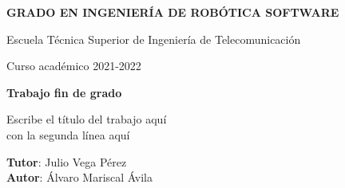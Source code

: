 \thispagestyle{empty}
\vspace{2cm}

\begin{figure}[htb]
	\centerline{}
\end{figure}

\begin{center}
	{\Large {\bf GRADO EN INGENIERÍA DE ROBÓTICA SOFTWARE}}
	\vspace{5mm}

	{\large {Escuela Técnica Superior de Ingeniería de Telecomunicación}}
	\vspace{5mm}

	{\large {Curso académico 2021-2022}}

	\vspace{1cm}

	{\large {\bf Trabajo fin de grado}}

	\vspace{2cm}

	{\Large {Escribe el título del trabajo aquí\\
			con la segunda línea aquí\\[1cm] }}

	\vspace{5cm}
	{\bf Tutor}: Julio Vega Pérez \\
	{\bf Autor}: Álvaro Mariscal Ávila
\end{center}

\clearpage
\thispagestyle{empty}
